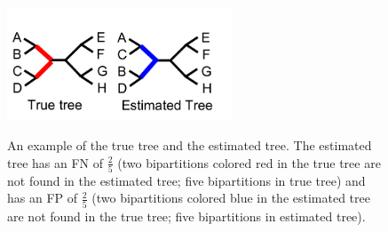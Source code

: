 \begin{figure}[htbp]
\centering
{\includegraphics[width=0.60\textwidth]{background/unrooted_phylogeny_a}}
\caption[Computing error metrics of estimated tree.]{An example of the true tree and the estimated tree.  The estimated tree has an FN of $\frac{2}{5}$ (two bipartitions colored red in the true tree are not found in the estimated tree; five bipartitions in true tree) and has an FP of $\frac{2}{5}$ (two bipartitions colored blue in the estimated tree are not found in the true tree; five bipartitions in estimated tree).}  
\label{back:tree_error}
\end{figure}





